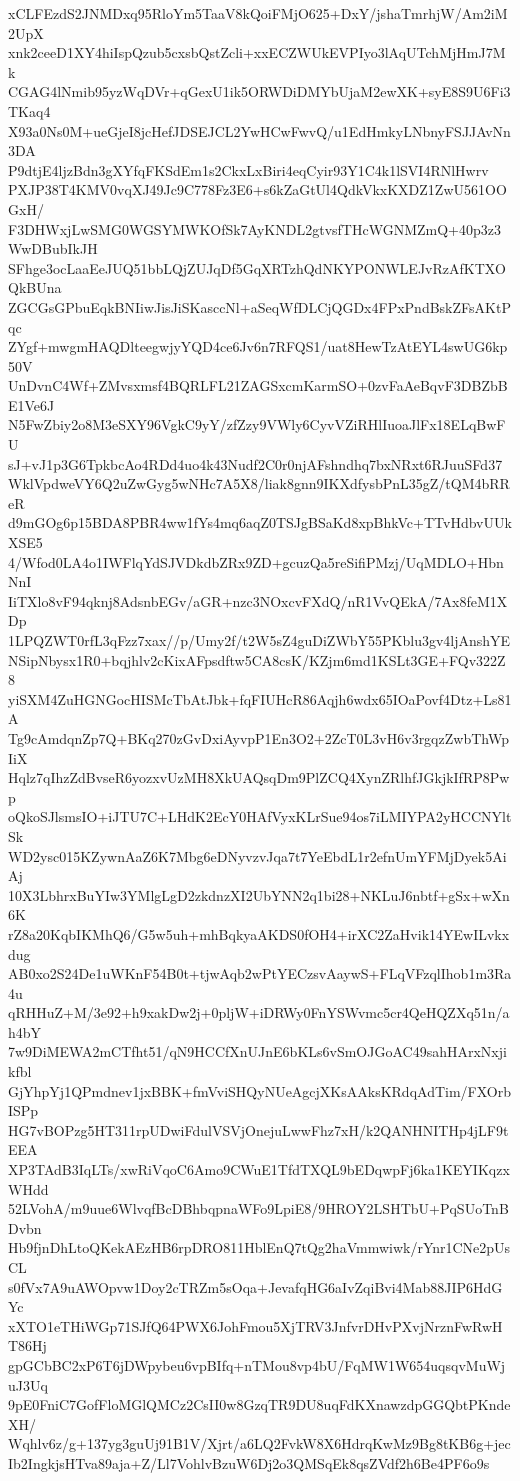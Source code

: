 xCLFEzdS2JNMDxq95RloYm5TaaV8kQoiFMjO625+DxY/jshaTmrhjW/Am2iM2UpX
xnk2ceeD1XY4hiIspQzub5cxsbQstZcli+xxECZWUkEVPIyo3lAqUTchMjHmJ7Mk
CGAG4lNmib95yzWqDVr+qGexU1ik5ORWDiDMYbUjaM2ewXK+syE8S9U6Fi3TKaq4
X93a0Ns0M+ueGjeI8jcHefJDSEJCL2YwHCwFwvQ/u1EdHmkyLNbnyFSJJAvNn3DA
P9dtjE4ljzBdn3gXYfqFKSdEm1s2CkxLxBiri4eqCyir93Y1C4k1lSVI4RNlHwrv
PXJP38T4KMV0vqXJ49Jc9C778Fz3E6+s6kZaGtUl4QdkVkxKXDZ1ZwU561OOGxH/
F3DHWxjLwSMG0WGSYMWKOfSk7AyKNDL2gtvsfTHcWGNMZmQ+40p3z3WwDBubIkJH
SFhge3ocLaaEeJUQ51bbLQjZUJqDf5GqXRTzhQdNKYPONWLEJvRzAfKTXOQkBUna
ZGCGsGPbuEqkBNIiwJisJiSKasccNl+aSeqWfDLCjQGDx4FPxPndBskZFsAKtPqc
ZYgf+mwgmHAQDlteegwjyYQD4ce6Jv6n7RFQS1/uat8HewTzAtEYL4swUG6kp50V
UnDvnC4Wf+ZMvsxmsf4BQRLFL21ZAGSxcmKarmSO+0zvFaAeBqvF3DBZbBE1Ve6J
N5FwZbiy2o8M3eSXY96VgkC9yY/zfZzy9VWly6CyvVZiRHlIuoaJlFx18ELqBwFU
sJ+vJ1p3G6TpkbcAo4RDd4uo4k43Nudf2C0r0njAFshndhq7bxNRxt6RJuuSFd37
WklVpdweVY6Q2uZwGyg5wNHc7A5X8/liak8gnn9IKXdfysbPnL35gZ/tQM4bRReR
d9mGOg6p15BDA8PBR4ww1fYs4mq6aqZ0TSJgBSaKd8xpBhkVc+TTvHdbvUUkXSE5
4/Wfod0LA4o1IWFlqYdSJVDkdbZRx9ZD+gcuzQa5reSifiPMzj/UqMDLO+HbnNnI
IiTXlo8vF94qknj8AdsnbEGv/aGR+nzc3NOxcvFXdQ/nR1VvQEkA/7Ax8feM1XDp
1LPQZWT0rfL3qFzz7xax//p/Umy2f/t2W5sZ4guDiZWbY55PKblu3gv4ljAnshYE
NSipNbysx1R0+bqjhlv2cKixAFpsdftw5CA8csK/KZjm6md1KSLt3GE+FQv322Z8
yiSXM4ZuHGNGocHISMcTbAtJbk+fqFIUHcR86Aqjh6wdx65IOaPovf4Dtz+Ls81A
Tg9cAmdqnZp7Q+BKq270zGvDxiAyvpP1En3O2+2ZcT0L3vH6v3rgqzZwbThWpIiX
Hqlz7qIhzZdBvseR6yozxvUzMH8XkUAQsqDm9PlZCQ4XynZRlhfJGkjkIfRP8Pwp
oQkoSJlsmsIO+iJTU7C+LHdK2EcY0HAfVyxKLrSue94os7iLMIYPA2yHCCNYltSk
WD2ysc015KZywnAaZ6K7Mbg6eDNyvzvJqa7t7YeEbdL1r2efnUmYFMjDyek5AiAj
10X3LbhrxBuYIw3YMlgLgD2zkdnzXI2UbYNN2q1bi28+NKLuJ6nbtf+gSx+wXn6K
rZ8a20KqbIKMhQ6/G5w5uh+mhBqkyaAKDS0fOH4+irXC2ZaHvik14YEwILvkxdug
AB0xo2S24De1uWKnF54B0t+tjwAqb2wPtYECzsvAaywS+FLqVFzqlIhob1m3Ra4u
qRHHuZ+M/3e92+h9xakDw2j+0pljW+iDRWy0FnYSWvmc5cr4QeHQZXq51n/ah4bY
7w9DiMEWA2mCTfht51/qN9HCCfXnUJnE6bKLs6vSmOJGoAC49sahHArxNxjikfbl
GjYhpYj1QPmdnev1jxBBK+fmVviSHQyNUeAgcjXKsAAksKRdqAdTim/FXOrbISPp
HG7vBOPzg5HT311rpUDwiFdulVSVjOnejuLwwFhz7xH/k2QANHNITHp4jLF9tEEA
XP3TAdB3IqLTs/xwRiVqoC6Amo9CWuE1TfdTXQL9bEDqwpFj6ka1KEYIKqzxWHdd
52LVohA/m9uue6WlvqfBcDBhbqpnaWFo9LpiE8/9HROY2LSHTbU+PqSUoTnBDvbn
Hb9fjnDhLtoQKekAEzHB6rpDRO811HblEnQ7tQg2haVmmwiwk/rYnr1CNe2pUsCL
s0fVx7A9uAWOpvw1Doy2cTRZm5sOqa+JevafqHG6aIvZqiBvi4Mab88JIP6HdGYc
xXTO1eTHiWGp71SJfQ64PWX6JohFmou5XjTRV3JnfvrDHvPXvjNrznFwRwHT86Hj
gpGCbBC2xP6T6jDWpybeu6vpBIfq+nTMou8vp4bU/FqMW1W654uqsqvMuWjuJ3Uq
9pE0FniC7GofFloMGlQMCz2CsII0w8GzqTR9DU8uqFdKXnawzdpGGQbtPKndeXH/
Wqhlv6z/g+137yg3guUj91B1V/Xjrt/a6LQ2FvkW8X6HdrqKwMz9Bg8tKB6g+jec
Ib2IngkjsHTva89aja+Z/Ll7VohlvBzuW6Dj2o3QMSqEk8qsZVdf2h6Be4PF6o9s
